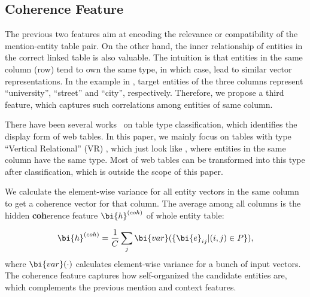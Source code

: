 \subsection{Coherence Feature}
\label{sec:coherence}

The previous two features aim at
encoding the relevance or compatibility of the mention-entity table pair.
On the other hand,
the inner relationship of entities in the correct linked table is also valuable.
The intuition is that entities in the same column (row) tend to own the 
same type, in which case, lead to similar vector representations.
In the example in , target entities of 
the three columns
represent ``university'', ``street'' and ``city'', respectively.
Therefore, we propose a third feature,
which captures such correlations among entities of same column. 


There have been several works~\cite{eberius2015building,nishida2017understanding} on table type classification,
which identifies the display form of web tables.
In this paper, we mainly focus on tables with type 
``Vertical Relational'' (VR) \cite{nishida2017understanding},
which just look like , where entities in the 
same column have the same type.
Most of web tables can be transformed into this type after classification, 
which is outside the scope of this paper.

We calculate the element-wise variance for all entity vectors in the same column
to get a coherence vector for that column.
The average among all columns is the hidden \textbf{coh}erence feature
$\bi{h}^{(coh)}$ of whole entity table:

\begin{equation}
  \label{eqn:coherence}
    \bi{h}^{(coh)} = \frac{1}{C} \sum_{j} \bi{var}(\{\bi{e}_{ij} | (i,j) \in P \}),
\end{equation}
\noindent
where $\bi{var}(\cdot)$ calculates element-wise variance for a bunch of 
input vectors.
The coherence feature captures how self-organized the candidate entities are,
which complements the previous mention and context features.
